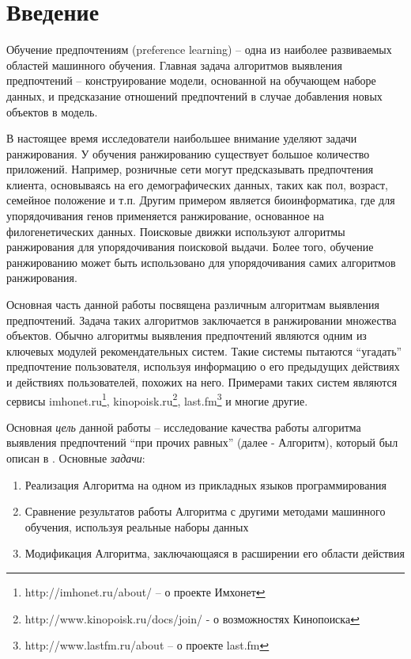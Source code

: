 \chapter*{Введение}

Обучение предпочтениям (preference learning) – одна из наиболее развиваемых областей машинного обучения. Главная задача алгоритмов выявления предпочтений – конструирование модели, основанной на обучающем наборе данных, и предсказание отношений предпочтений в случае добавления новых объектов в модель.

В настоящее время исследователи наибольшее внимание уделяют задачи ранжирования. У обучения ранжированию существует большое количество приложений. Например, розничные сети могут предсказывать предпочтения клиента, основываясь на его демографических данных, таких как пол, возраст, семейное положение и т.п. Другим примером является биоинформатика, где для упорядочивания генов применяется ранжирование, основанное на филогенетических данных. \cite{Balasubramaniyan:2005} Поисковые движки используют алгоритмы ранжирования для упорядочивания поисковой выдачи. Более того, обучение ранжированию может быть использовано для упорядочивания самих алгоритмов ранжирования\cite{Brazdil:2003}.

Основная часть данной работы посвящена различным алгоритмам выявления предпочтений. Задача таких алгоритмов заключается в ранжировании множества объектов. Обычно алгоритмы выявления предпочтений являются одним из ключевых модулей рекомендательных систем. Такие системы пытаются \enquote{угадать} предпочтение пользователя, используя информацию о его предыдущих действиях и действиях пользователей, похожих на него. Примерами таких систем являются сервисы imhonet.ru\footnote{http://imhonet.ru/about/ – о проекте Имхонет}, kinopoisk.ru\footnote{http://www.kinopoisk.ru/docs/join/ - о возможностях Кинопоиска}, last.fm\footnote{http://www.lastfm.ru/about – о проекте last.fm} и многие другие.

Основная \emph{цель} данной работы – исследование качества работы алгоритма выявления предпочтений \enquote{при прочих равных} (далее - Алгоритм), который был описан в \cite{Obiedkov:2013}. Основные \emph{задачи}:
\begin{enumerate}[itemsep=-1mm]
	\item Реализация Алгоритма на одном из прикладных языков программирования
	\item Сравнение результатов работы Алгоритма с другими методами машинного обучения, используя реальные наборы данных
	\item Модификация Алгоритма, заключающаяся в расширении его области действия
\end{enumerate}

